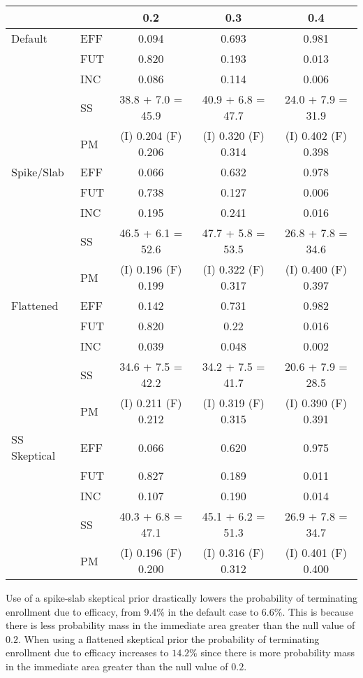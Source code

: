 \documentclass[12pt]{article}
\begin{document}
\begin{center}
\begin{tabular}{ll|ccc}
	&		&	0.2	&	0.3	&	0.4	\\
\hline
Default	&	EFF	&	0.094	&	0.693	&	0.981	\\
	&	FUT	&	0.820	&	0.193	&	0.013	\\
	&	INC	&	0.086	&	0.114	&	0.006	\\
	&	SS	&	38.8 + 7.0 = 45.9	&	40.9 + 6.8 = 47.7	&	24.0 + 7.9 = 31.9	\\
	&	PM	&	(I) 0.204 (F) 0.206	&	(I) 0.320 (F) 0.314	&	(I) 0.402 (F) 0.398	\\
\hline
Spike/Slab	&	EFF	&	0.066	&	0.632	&	0.978	\\
	&	FUT	&	0.738	&	0.127	&	0.006	\\
	&	INC	&	0.195	&	0.241	&	0.016	\\
	&	SS	&	46.5 + 6.1 = 52.6	&	47.7 + 5.8 = 53.5	&	26.8 + 7.8 = 34.6	\\
	&	PM	&	(I) 0.196 (F) 0.199	&	(I) 0.322 (F) 0.317	&	(I) 0.400 (F) 0.397	\\
\hline
Flattened	&	EFF	&	0.142	&	0.731	&	0.982	\\
	&	FUT	&	0.820	&	0.22	&	0.016	\\
	&	INC	&	0.039	&	0.048	&	0.002	\\
	&	SS	&	34.6 + 7.5 = 42.2	&	34.2 + 7.5 = 41.7	&	20.6 + 7.9 = 28.5	\\
	&	PM	&	(I) 0.211 (F) 0.212	&	(I) 0.319 (F) 0.315	&	(I) 0.390 (F) 0.391	\\
\hline
SS Skeptical	&	EFF	&	0.066	&	0.620	&	0.975	\\
	&	FUT	&	0.827	&	0.189	&	0.011	\\
	&	INC	&	0.107	&	0.190	&	0.014	\\
	&	SS	&	40.3 + 6.8 = 47.1	&	45.1 + 6.2 = 51.3	&	26.9 + 7.8 = 34.7	\\
	&	PM	&	(I) 0.196 (F) 0.200	&	(I) 0.316 (F) 0.312	&	(I) 0.401 (F) 0.400	\\

\end{tabular}
\end{center}
Use of a spike-slab skeptical prior drastically lowers the probability of terminating enrollment due to efficacy, from 9.4\% in the default case to 6.6\%. This is because there is less probability mass in the immediate area greater than the null value of $0.2$. When using a flattened skeptical prior the probability of terminating enrollment due to efficacy increases to $14.2\%$ since there is more probability mass in the immediate area greater than the null value of $0.2$.
\newpage
\end{document}
